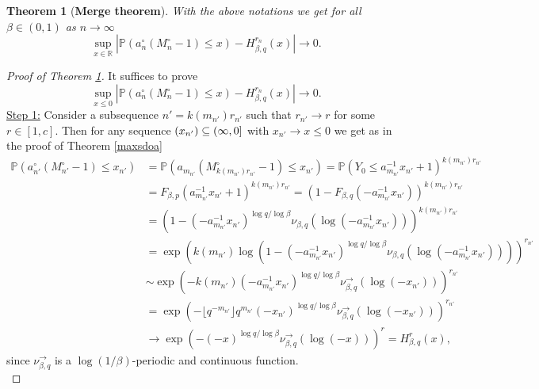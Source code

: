 \documentclass[10pt,a4paper]{amsart}
\newtheorem{theorem}{Theorem}
\newcommand{\Pm}{{\mathbb P}}
\newcommand{\rr}{{\mathbb R}}
\begin{document}
\begin{theorem}[\bf Merge theorem]\label{merge}
With the above notations we get for all $\beta\in(0,1)$ as $n\to\infty$
\begin{equation}\label{mergecomp}
\sup_{x\in\rr}\left|\Pm\left(a_{n}^{\circ}(M_{n}^{\circ}-1)\leq x\right)-H^{r_{n}}_{\beta,q}(x)\right|\to0.
\end{equation}
\end{theorem}

\begin{proof}[Proof of Theorem \ref{merge}]
It suffices to prove
\begin{equation}\label{mergesuff}
\sup_{x\leq0}\left|\Pm\left(a_{n}^{\circ}(M_{n}^{\circ}-1)\leq x\right)-H^{r_{n}}_{\beta,q}(x)\right|\to0.
\end{equation}
\underline{Step 1:} Consider a subsequence $n'=k(m_{n'})r_{n'}$ such that $r_{n'}\to r$ for some $r\in[1,c]$. Then for any sequence $(x_{n'})\subseteq(\-\infty,0]$ with $x_{n'}\to x\leq0$ we get as in the proof of Theorem \ref{maxsdoa}
\begin{align*}
\Pm\left(a_{n'}^{\circ}(M_{n'}^{\circ}-1)\leq x_{n'}\right) & =\Pm\left(a_{m_{n'}}(M_{k(m_{n'})r_{n'}}^{\circ}-1)\leq x_{n'}\right) =\Pm(Y_{0}\leq a_{m_{n'}}^{-1}x_{n'}+1)^{k(m_{n'})r_{n'}}\\
& =F_{\beta,p}(a_{m_{n'}}^{-1}x_{n'}+1)^{k(m_{n'})r_{n'}}=\left(1-F_{\beta,q}(-a_{m_{n'}}^{-1}x_{n'})\right)^{k(m_{n'})r_{n'}}\\
& =\left(1-(-a_{m_{n'}}^{-1}x_{n'})^{\log q/\log\beta}\nu_{\beta,q}(\log(-a_{m_{n'}}^{-1}x_{n'}))\right)^{k(m_{n'})r_{n'}}\\
& =\exp\left(k(m_{n'})\log\left(1-(-a_{m_{n'}}^{-1}x_{n'})^{\log q/\log\beta}\nu_{\beta,q}(\log(-a_{m_{n'}}^{-1}x_{n'}))\right)\right)^{r_{n'}}\\
& \sim\exp\left(-k(m_{n'})(-a_{m_{n'}}^{-1}x_{n'})^{\log q/\log\beta}\nu_{\beta,q}^{\to}(\log(-x_{n'}))\right)^{r_{n'}}\\
& =\exp\left(-\lfloor q^{-m_{n'}}\rfloor q^{m_{n'}}(-x_{n'})^{\log q/\log\beta}\nu_{\beta,q}^{\to}(\log(-x_{n'}))\right)^{r_{n'}}\\
& \to\exp\left(-(-x)^{\log q/\log\beta}\nu_{\beta,q}^{\to}(\log(-x))\right)^{r}=H_{\beta,q}^{r}(x),
\end{align*}
since $\nu_{\beta,q}^{\to}$ is a $\log(1/\beta)$-periodic and continuous function.\\[1ex]


\end{proof}
\end{document}
